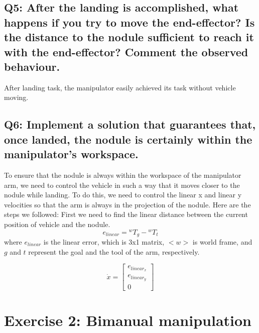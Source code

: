 \documentclass{article}
\begin{document}
\subsection{Q5: After the landing is accomplished, what happens if you try to move the end-effector? Is the distance to the nodule sufficient to reach it with the end-effector? Comment the observed behaviour.}
After landing task, the manipulator easily achieved its task without vehicle moving. \\ 
\subsection{Q6: Implement a solution that guarantees that, once landed, the nodule is certainly within the manipulator's workspace.}
To ensure that the nodule is always within the workspace of the manipulator arm, we need to control the vehicle in such a way that it moves closer to the nodule while landing. To do this, we need to control the linear x and linear y velocities so that the arm is always in the projection of the nodule. Here are the steps we followed:
First we need to find the linear distance between the current position of vehicle and the nodule.   
    $$e_{linear}  = {}^{w}T_{g} - {}^{w}T_{t}$$
where $e_{linear}$ is the linear error, which is 3x1 matrix, $<w>$ is world frame, and $g$ and $t$ represent the goal and the tool of the arm, respectively.

$$\dot{x} = \begin{bmatrix}
		e_{linear_x} \\
            e_{linear_y} \\
            0
		\end{bmatrix} $$


\clearpage
\section{Exercise 2: Bimanual manipulation}
\end{document}
